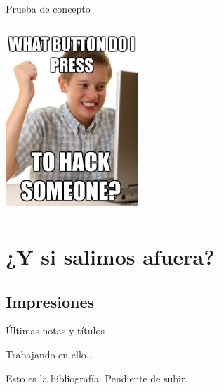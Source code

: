 \documentclass{beamer}
\begin{document}
\begin{frame}

\centering Prueba de concepto

\includegraphics[width=5cm, height=7cm]{poc.jpg}

\end{frame}



\section{¿Y si salimos afuera?}

\subsection{Impresiones}

\begin{frame}{Últimas notas y títulos}

Trabajando en ello...

\end{frame}

\begin{thebibliography}{10}
 Esto es la bibliografía. Pendiente de subir.
\end{thebibliography}
\end{document}
